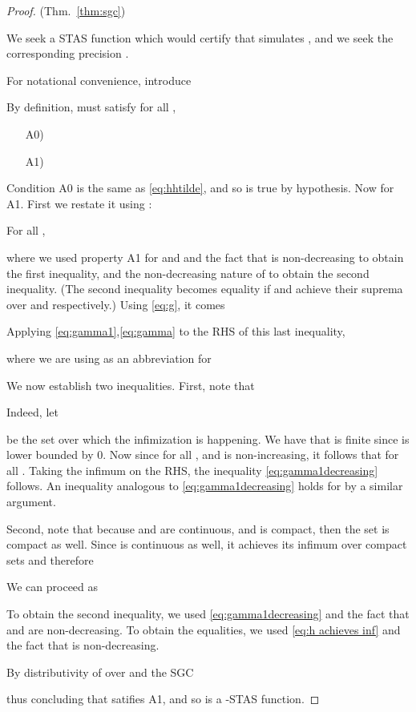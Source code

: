 	\begin{proof} (Thm.~\ref{thm:sgc})
		
		We seek a STAS function  which would certify that  simulates , and we seek the corresponding precision .
		
		For notational convenience, introduce
		
		
		
			By definition,  must satisfy for all ,
			\begin{enumerate}
				\item[A0)] 
				\label{item:V0}
				\item[A1)] 	
				\label{item:V1}
			\end{enumerate}
		
		Condition A0 is the same as \eqref{eq:hhtilde}, and so is true by hypothesis.	
		Now for A1. 
		First we restate it using :
		
		For all ,
		
		where we used property A1 for  and  and the fact that  is non-decreasing to obtain the first inequality, and the non-decreasing nature of  to obtain the second inequality.
		(The second inequality becomes equality if  and  achieve their suprema over  and  respectively.)
		Using \eqref{eq:g}, it comes
		
		
		Applying \eqref{eq:gamma1},\eqref{eq:gamma} to the RHS of this last inequality, 
		
		where we are using  as an abbreviation for 
		
We now establish two inequalities.
		First, note that 
		
		Indeed, let 
		
		be the set over which the infimization is happening.
		We have that  is finite since  is lower bounded by 0. 
		Now since  for all ,
		and  is non-increasing, it follows that  for all . Taking the infimum on the RHS, the inequality \eqref{eq:gamma1decreasing} follows. 
		An inequality analogous to \eqref{eq:gamma1decreasing} holds for  by a similar argument.
		
		Second, note that because  and  are continuous, and  is compact, then the set  is compact as well. 
		Since  is continuous as well, it achieves its infimum over compact sets and therefore 
		
		
		We can proceed as
		
		To obtain the second inequality, we used \eqref{eq:gamma1decreasing} and the fact that  and  are non-decreasing.
		To obtain the equalities, we used \eqref{eq:h achieves inf} and the fact that  is non-decreasing.
		
		By distributivity of  over  and the SGC
		
		thus concluding that  satifies A1, and so is a -STAS function.
	\end{proof}


